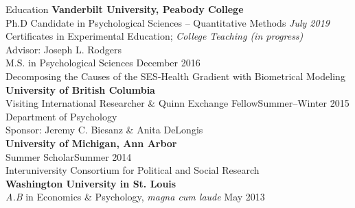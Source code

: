 \begin{rSection}{\textrm{Education}}
{\bf Vanderbilt University, Peabody College}\\
Ph.D Candidate in Psychological Sciences -- Quantitative Methods \hfill{\textit{July 2019}}\\%
\hspace*{\pindent}Certificates in Experimental Education; \textit{College Teaching (in progress)}\\
\hspace*{\pindent}Advisor: Joseph L. Rodgers%
\smallskip\\
M.S. in Psychological Sciences \hfill{December 2016} \\
\hspace*{\pindent}Decomposing the Causes of the SES-Health Gradient with Biometrical Modeling%
\medskip\\
\textbf{University of British Columbia}\\
Visiting International Researcher \& Quinn Exchange Fellow\hfill{Summer--Winter 2015}\\
\hspace*{\pindent}Department of Psychology\\
\hspace*{\pindent}Sponsor: Jeremy C. Biesanz \& Anita DeLongis\medskip\\
\textbf{University of Michigan, Ann Arbor}\\
Summer Scholar\hfill{Summer 2014}\\
\hspace*{\pindent}Interuniversity Consortium for Political and Social Research\medskip\\
{\bf Washington University in St. Louis}\\
{\em A.B} in Economics \& Psychology, \textit{magna cum laude} \hfill{May 2013}%
\end{rSection}